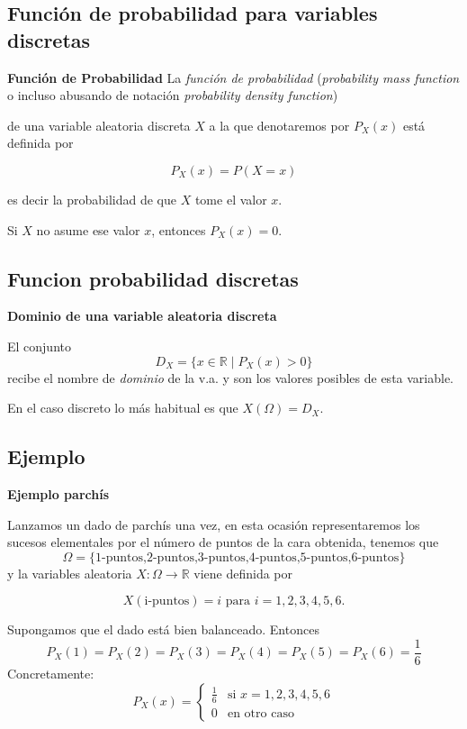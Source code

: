 \documentclass[]{book}
\begin{document}
\hypertarget{funciuxf3n-de-probabilidad-para-variables-discretas}{%
\subsection{Función de probabilidad para variables discretas}\label{funciuxf3n-de-probabilidad-para-variables-discretas}}

 \textbf{Función de Probabilidad}
La \emph{función de probabilidad} (\emph{probability mass function} o incluso abusando de notación \emph{probability density function})

de una variable aleatoria discreta \(X\) a la que denotaremos por \(P_{X}(x)\)
está definida por

\[P_{X}(x)=P(X=x)\]

es decir la probabilidad de que \(X\) tome el valor \(x\).

Si \(X\) no asume ese valor \(x\), entonces
\(P_{X}(x)=0\).

\hypertarget{funcion-probabilidad-discretas}{%
\subsection{Funcion probabilidad discretas}\label{funcion-probabilidad-discretas}}

 \textbf{Dominio de una variable aleatoria discreta}

El conjunto \[D_X=\{ x\in\mathbb{R} \mid P_X(x)>0\}\] recibe el nombre de
\emph{dominio} de la v.a. y son los valores posibles de esta variable.

En el caso discreto lo más habitual es que \(X(\Omega)=D_X\).

\hypertarget{ejemplo-5}{%
\subsection{Ejemplo}\label{ejemplo-5}}

\textbf{Ejemplo parchís}

Lanzamos un dado de parchís una vez, en esta ocasión representaremos los
sucesos elementales por el número de puntos de la cara obtenida, tenemos que
\[\Omega=\{\mbox{1-puntos,2-puntos,3-puntos,4-puntos,5-puntos,6-puntos}\}\]
y la variables aleatoria \(X:\Omega\to \mathbb{R}\) viene definida por

\[X(\mbox{i-puntos})=i\mbox{ para } i=1,2,3,4,5,6.\]

Supongamos que el dado está bien balanceado. Entonces
\[P_{X}(1)=P_{X}(2)=P_{X}(3)=P_{X}(4)=P_{X}(5)=P_{X}(6)=\frac16\]
Concretamente:
\[
P_{X}(x)=
  \left\{
  \begin{array}{ll}
   \frac16 & \mbox{si } x=1,2,3,4,5,6\\
  0 & \mbox{en otro caso }
  \end{array}
  \right.
\]
\end{document}
